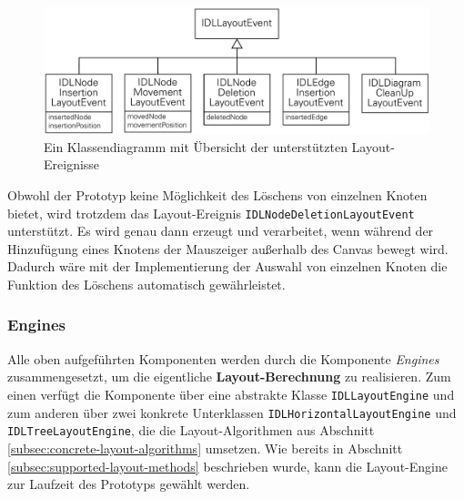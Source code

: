 \begin{figure}[hbt]
    \centering
    \includegraphics[scale=0.8]{assets/layout-events-implementation}
    \caption{Ein Klassendiagramm mit Übersicht der unterstützten Layout-Ereignisse}
    \label{fig:layout-events-implementation}
\end{figure}

Obwohl der Prototyp keine Möglichkeit des Löschens von einzelnen Knoten bietet, wird trotzdem das Layout-Ereignis \texttt{IDLNodeDeletionLayoutEvent} unterstützt. Es wird genau dann erzeugt und verarbeitet, wenn während der Hinzufügung eines Knotens der Mauszeiger außerhalb des Canvas bewegt wird. Dadurch wäre mit der Implementierung der Auswahl von einzelnen Knoten die Funktion des Löschens automatisch gewährleistet.

\subsubsection{Engines}
\label{subsubsec:component-engines}

Alle oben aufgeführten Komponenten werden durch die Komponente \textit{Engines} zusammengesetzt, um die eigentliche \textbf{Layout-Berechnung} zu realisieren. Zum einen verfügt die Komponente über eine abstrakte Klasse \texttt{IDLLayoutEngine} und zum anderen über zwei konkrete Unterklassen \texttt{IDLHorizontalLayoutEngine} und \texttt{IDLTreeLayoutEngine}, die die Layout-Algorithmen aus Abschnitt \ref{subsec:concrete-layout-algorithms} umsetzen. Wie bereits in Abschnitt \ref{subsec:supported-layout-methods} beschrieben wurde, kann die Layout-Engine zur Laufzeit des Prototyps gewählt werden.


